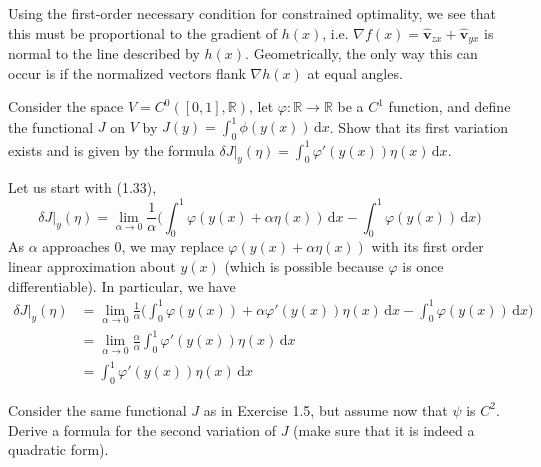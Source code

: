 \documentclass[../calculus-of-variations-and-optimal-control-theory.tex]{subfiles}
\begin{document}
\begin{questions}
\begin{solution}
	Using the first-order necessary condition for constrained optimality, we see that this must be proportional to the gradient of $h(x)$, i.e. $\nabla f(x) = \hat{\mathbf{v}}_{zx} + \hat{\mathbf{v}}_{yx}$ is normal to the line described by $h(x)$. Geometrically, the only way this can occur is if the normalized vectors flank $\nabla h(x)$ at equal angles.
\end{solution}

\question Consider the space $V = C^0([0, 1], \mathbb{R})$, let $\varphi : \mathbb{R} \to \mathbb{R}$ be a $C^1$ function, and define the functional $J$ on $V$ by $J(y) = \int_0^1\phi(y(x))\,\mathrm{d}x$. Show that its first variation exists and is given by the formula $\delta J|_y(\eta) = \int_0^1\varphi'(y(x))\eta(x)\,\mathrm{d}x$.

\begin{solution}
	Let us start with (1.33),
	\[
		\delta J|_y (\eta) = \lim_{\alpha \to 0}\frac{1}{\alpha}\Big(\int_0^1\varphi(y(x) + \alpha\eta(x))\,\mathrm{d}x - \int_0^1\varphi(y(x))\,\mathrm{d}x\Big)
	\]
	As $\alpha$ approaches $0$, we may replace $\varphi(y(x) + \alpha\eta(x))$ with its first order linear approximation about $y(x)$ (which is possible because $\varphi$ is once differentiable). In particular, we have
	\begin{align*}
		\delta J|_y (\eta) &= \lim_{\alpha \to 0}\frac{1}{\alpha}\Big(\int_0^1\varphi(y(x)) + \alpha\varphi'(y(x))\eta(x)\,\mathrm{d}x - \int_0^1\varphi(y(x))\,\mathrm{d}x\Big) \\
		&= \lim_{\alpha \to 0}\frac{\alpha}{\alpha}\int_0^1\varphi'(y(x))\eta(x)\,\mathrm{d}x \\
		&= \int_0^1\varphi'(y(x))\eta(x)\,\mathrm{d}x
	\end{align*}
\end{solution}

\question Consider the same functional $J$ as in Exercise 1.5, but assume now that $\psi$ is $C^2$. Derive a formula for the second variation of $J$ (make sure that it is indeed a quadratic form).


\end{questions}
\end{document}
